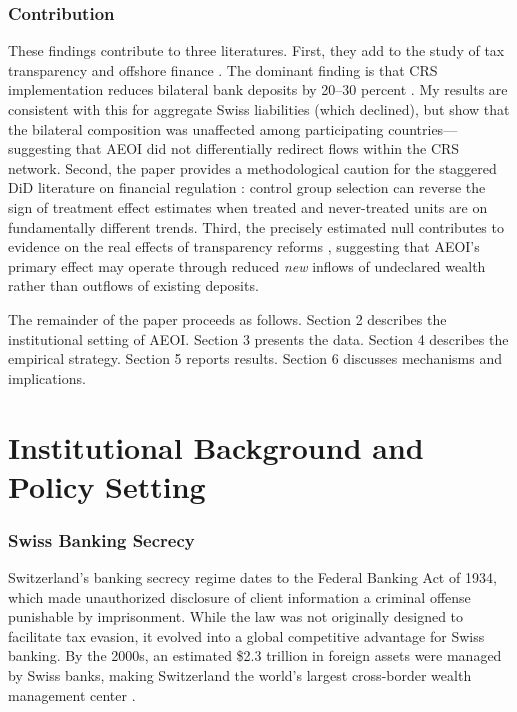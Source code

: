\documentclass[12pt]{article}
\begin{document}
\subsubsection*{Contribution} These findings contribute to three literatures. First, they add to the study of tax transparency and offshore finance \citep{zucman2013missing, johannesen2014tax, johannesen2014end, menkhoff2019tax, beer2020global}. The dominant finding is that CRS implementation reduces bilateral bank deposits by 20--30 percent \citep{casi2020cross, oberson2015aeoi}. My results are consistent with this for aggregate Swiss liabilities (which declined), but show that the bilateral composition was unaffected among participating countries---suggesting that AEOI did not differentially redirect flows within the CRS network. Second, the paper provides a methodological caution for the staggered DiD literature on financial regulation \citep{demirguc2004bank, barth2004bank, de2020two}: control group selection can reverse the sign of treatment effect estimates when treated and never-treated units are on fundamentally different trends. Third, the precisely estimated null contributes to evidence on the real effects of transparency reforms \citep{slemrod2015tax}, suggesting that AEOI's primary effect may operate through reduced \textit{new} inflows of undeclared wealth rather than outflows of existing deposits.

The remainder of the paper proceeds as follows. Section 2 describes the institutional setting of AEOI. Section 3 presents the data. Section 4 describes the empirical strategy. Section 5 reports results. Section 6 discusses mechanisms and implications.

\section{Institutional Background and Policy Setting}

\subsubsection*{Swiss Banking Secrecy} Switzerland's banking secrecy regime dates to the Federal Banking Act of 1934, which made unauthorized disclosure of client information a criminal offense punishable by imprisonment. While the law was not originally designed to facilitate tax evasion, it evolved into a global competitive advantage for Swiss banking. By the 2000s, an estimated \$2.3 trillion in foreign assets were managed by Swiss banks, making Switzerland the world's largest cross-border wealth management center \citep{zucman2013missing}.
\end{document}
